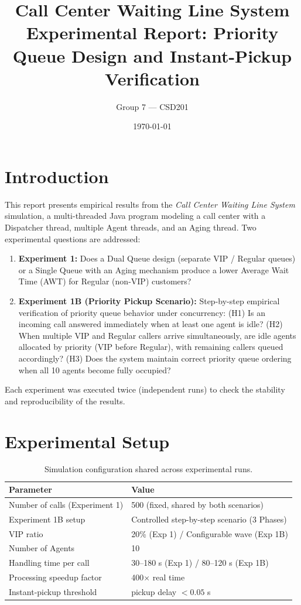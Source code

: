 \documentclass[11pt]{article}
\title{\textbf{Call Center Waiting Line System}\\[4pt]
\large Experimental Report: Priority Queue Design and Instant-Pickup Verification}
\author{Group 7 --- CSD201}
\date{\today}
\begin{document}
\maketitle

\section{Introduction}
This report presents empirical results from the \textit{Call Center Waiting Line System} simulation, a multi-threaded Java program modeling a call center with a Dispatcher thread, multiple Agent threads, and an Aging thread. Two experimental questions are addressed:

\begin{enumerate}
    \item \textbf{Experiment 1:} Does a Dual Queue design (separate VIP / Regular queues) or a Single Queue with an Aging mechanism produce a lower Average Wait Time (AWT) for Regular (non-VIP) customers?
    \item \textbf{Experiment 1B (Priority Pickup Scenario):} Step-by-step empirical verification of priority queue behavior under concurrency: (H1) Is an incoming call answered immediately when at least one agent is idle? (H2) When multiple VIP and Regular callers arrive simultaneously, are idle agents allocated by priority (VIP before Regular), with remaining callers queued accordingly? (H3) Does the system maintain correct priority queue ordering when all 10 agents become fully occupied?
\end{enumerate}

Each experiment was executed twice (independent runs) to check the stability and reproducibility of the results.

\section{Experimental Setup}
\begin{table}[htbp]
\centering
\begin{tabular}{ll}
\toprule
\textbf{Parameter} & \textbf{Value} \\
\midrule
Number of calls (Experiment 1) & 500 (fixed, shared by both scenarios) \\
Experiment 1B setup & Controlled step-by-step scenario (3 Phases) \\
VIP ratio & 20\% (Exp 1) / Configurable wave (Exp 1B) \\
Number of Agents & 10 \\
Handling time per call & 30--180 s (Exp 1) / 80--120 s (Exp 1B) \\
Processing speedup factor & 400$\times$ real time \\
Instant-pickup threshold & pickup delay $< 0.05$ s \\
\bottomrule
\end{tabular}
\caption{Simulation configuration shared across experimental runs.}
\end{table}
\end{document}
